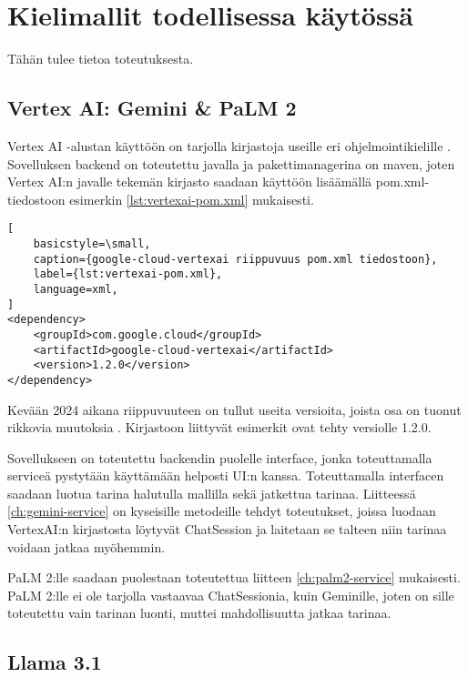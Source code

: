 \chapter{Kielimallit todellisessa käytössä}%
\label{ch:toteutus}

Tähän tulee tietoa toteutuksesta.

\section{Vertex AI: Gemini \& PaLM 2}

Vertex AI -alustan käyttöön on tarjolla kirjastoja useille eri
ohjelmointikielille \parencite{vertexAiGenerativeAiQuickstart}. Sovelluksen
backend on toteutettu javalla ja pakettimanagerina on maven, joten Vertex AI:n
javalle tekemän kirjasto saadaan käyttöön lisäämällä pom.xml-tiedostoon
esimerkin \ref{lst:vertexai-pom.xml} mukaisesti.

\begin{lstlisting}[
    basicstyle=\small,
    caption={google-cloud-vertexai riippuvuus pom.xml tiedostoon},
    label={lst:vertexai-pom.xml},
    language=xml,
]
<dependency>
    <groupId>com.google.cloud</groupId>
    <artifactId>google-cloud-vertexai</artifactId>
    <version>1.2.0</version>
</dependency>
\end{lstlisting}

Kevään 2024 aikana riippuvuuteen on tullut useita versioita, joista osa on
tuonut rikkovia muutoksia \parencite{mavenGoogleVertexAIAPI}. Kirjastoon
liittyvät esimerkit ovat tehty versiolle 1.2.0.

Sovellukseen on toteutettu backendin puolelle interface, jonka toteuttamalla
serviceä pystytään käyttämään helposti UI:n kanssa. Toteuttamalla interfacen
saadaan luotua tarina halutulla mallilla sekä jatkettua tarinaa. Liitteessä
\ref{ch:gemini-service} on kyseisille metodeille tehdyt toteutukset, joissa
luodaan VertexAI:n kirjastosta löytyvät ChatSession ja laitetaan se talteen
niin tarinaa voidaan jatkaa myöhemmin.

PaLM 2:lle saadaan puolestaan toteutettua liitteen \ref{ch:palm2-service}
mukaisesti. PaLM 2:lle ei ole tarjolla vastaavaa ChatSessionia, kuin Geminille,
joten on sille toteutettu vain tarinan luonti, muttei mahdollisuutta jatkaa
tarinaa.

\section{Llama 3.1}

